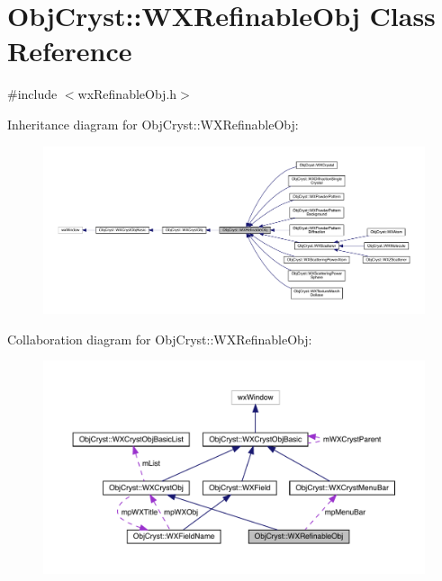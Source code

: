 \hypertarget{class_obj_cryst_1_1_w_x_refinable_obj}{}\section{Obj\+Cryst\+::W\+X\+Refinable\+Obj Class Reference}
\label{class_obj_cryst_1_1_w_x_refinable_obj}


{\ttfamily \#include $<$wx\+Refinable\+Obj.\+h$>$}



Inheritance diagram for Obj\+Cryst\+::W\+X\+Refinable\+Obj\+:
\nopagebreak
\begin{figure}[H]
\begin{center}
\leavevmode
\includegraphics[width=350pt]{class_obj_cryst_1_1_w_x_refinable_obj__inherit__graph}
\end{center}
\end{figure}


Collaboration diagram for Obj\+Cryst\+::W\+X\+Refinable\+Obj\+:
\nopagebreak
\begin{figure}[H]
\begin{center}
\leavevmode
\includegraphics[width=350pt]{class_obj_cryst_1_1_w_x_refinable_obj__coll__graph}
\end{center}
\end{figure}
